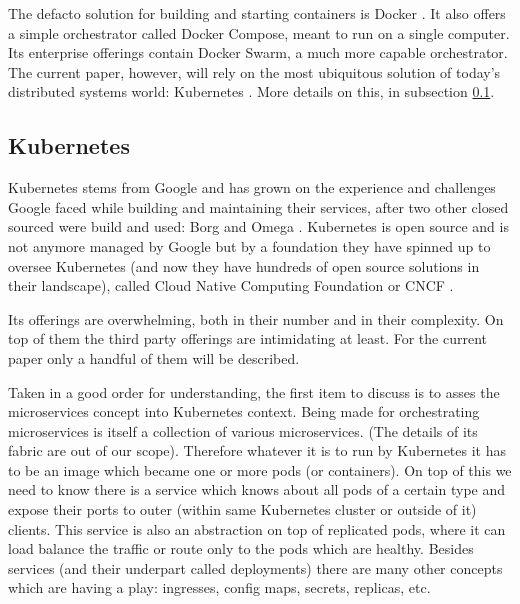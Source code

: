 \documentclass[conference]{IEEEtran}
\begin{document}
    The defacto solution for building and starting containers is Docker \cite{b8}. It also offers a simple orchestrator called Docker Compose, meant to run on a single computer. Its enterprise offerings contain Docker Swarm, a much more capable orchestrator. The current paper, however, will rely on the most ubiquitous solution of today's distributed systems world: Kubernetes \cite{b9}. More details on this, in subsection \ref{subsec:kube}.

\subsection{Kubernetes}
\label{subsec:kube}

    Kubernetes stems from Google and has grown on the experience and challenges Google faced while building and maintaining their services, after two other closed sourced were build and used: Borg and Omega \cite{b9}. Kubernetes is open source and is not anymore managed by Google but by a foundation they have spinned up to oversee Kubernetes (and now they have hundreds of open source solutions in their landscape), called Cloud Native Computing Foundation or CNCF \cite{b11}.

    Its offerings are overwhelming, both in their number and in their complexity. On top of them the third party offerings are intimidating at least. For the current paper only a handful of them will be described.

    Taken in a good order for understanding, the first item to discuss is to asses the microservices concept into Kubernetes context. Being made for orchestrating microservices is itself a collection of various microservices. (The details of its fabric are out of our scope). Therefore whatever it is to run by Kubernetes it has to be an image which became one or more pods (or containers). On top of this we need to know there is a service which knows about all pods of a certain type and expose their ports to outer (within same Kubernetes cluster or outside of it) clients. This service is also an abstraction on top of replicated pods, where it can load balance the traffic or route only to the pods which are healthy. Besides services (and their underpart called deployments) there are many other concepts which are having a play: ingresses, config maps, secrets, replicas, etc.
\end{document}
